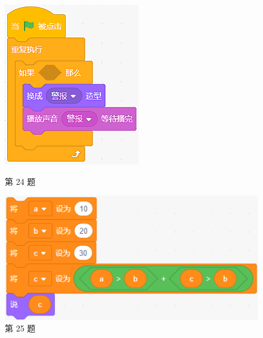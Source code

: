 \documentclass[10pt, a4paper]{article}
\begin{document}
    \begin{figure}[htbp]
        \centering
        \begin{minipage}[t]{.14\textwidth}
            \centering
            \includegraphics[width=\textwidth]{figure/24.png}
            \caption*{第 24 题}
        \end{minipage}
        \begin{minipage}[t]{.34\textwidth}
            \centering
            \includegraphics[width=\textwidth]{figure/25.png}
            \caption*{第 25 题}

\end{minipage}
\end{figure}
\end{document}
